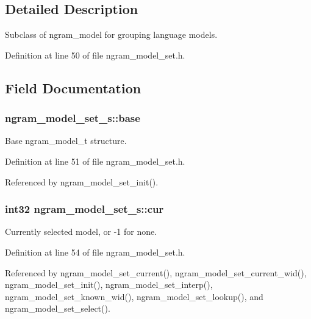 \subsection{Detailed Description}
Subclass of ngram\-\_\-model for grouping language models. 

Definition at line 50 of file ngram\-\_\-model\-\_\-set.\-h.



\subsection{Field Documentation}
\subsubsection[{base}]{ ngram\-\_\-model\-\_\-set\-\_\-s\-::base}\label{structngram__model__set__s_a3b88f17aa148ceac4f32dd4cbf5f4f81}


Base ngram\-\_\-model\-\_\-t structure. 



Definition at line 51 of file ngram\-\_\-model\-\_\-set.\-h.



Referenced by ngram\-\_\-model\-\_\-set\-\_\-init().

\subsubsection[{cur}]{\setlength{\rightskip}{0pt plus 5cm}int32 ngram\-\_\-model\-\_\-set\-\_\-s\-::cur}\label{structngram__model__set__s_a031e7d7dcf1667f69e1cb980f45623cb}


Currently selected model, or -\/1 for none. 



Definition at line 54 of file ngram\-\_\-model\-\_\-set.\-h.



Referenced by ngram\-\_\-model\-\_\-set\-\_\-current(), ngram\-\_\-model\-\_\-set\-\_\-current\-\_\-wid(), ngram\-\_\-model\-\_\-set\-\_\-init(), ngram\-\_\-model\-\_\-set\-\_\-interp(), ngram\-\_\-model\-\_\-set\-\_\-known\-\_\-wid(), ngram\-\_\-model\-\_\-set\-\_\-lookup(), and ngram\-\_\-model\-\_\-set\-\_\-select().

